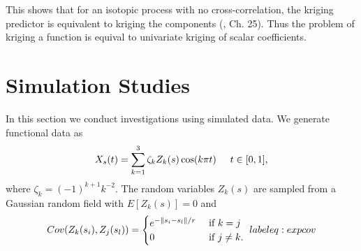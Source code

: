 This shows that for an isotopic process with no cross-correlation, the kriging predictor is equivalent to kriging the components (\cite{wackernagel2003multivariate}, Ch. 25). Thus the problem of kriging a function is equival to univariate kriging of scalar coefficients. 

	



\section{Simulation Studies} 

\label{sec:numerical_experiments}

In this section we conduct investigations using simulated data. We generate functional data as
\begin{equation}
	X_s(t) = \sum^{3}_{k=1}\zeta_k Z_k(s) \cos(k\pi t) \hspace{0.5cm} t \in [0,1], 
	\label{eq:sim process2} 
\end{equation}
where \(\zeta_k=(-1)^{k+1}k^{-2}\). The random variables $Z_k(s)$ are sampled from a Gaussian random field with $E[Z_k(s)]=0$ and 
\begin{equation}
	Cov(Z_k(s_i), Z_j(s_l)) = \begin{cases} 
																e^{-\norm{s_i - s_l}/r} &\mbox{ if } k = j\\
																0 & \mbox{ if } j \neq k.
															\end{cases}
	\	label{eq:exp cov}
\end{equation} 



